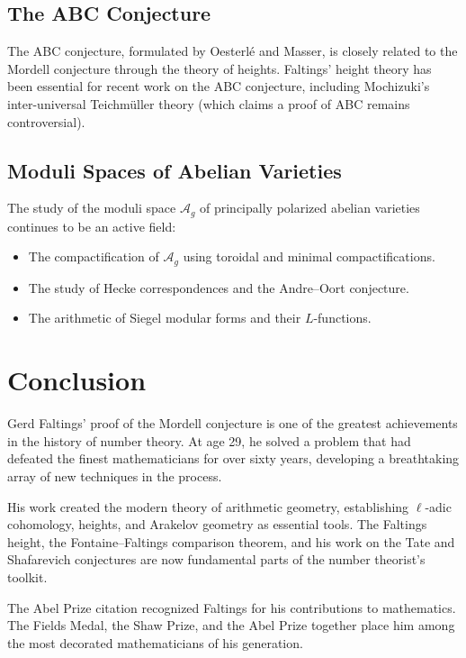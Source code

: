 \subsection{The ABC Conjecture}

The ABC conjecture, formulated by Oesterl\'e and Masser, is closely related to the Mordell conjecture through the theory of heights. Faltings' height theory has been essential for recent work on the ABC conjecture, including Mochizuki's inter-universal Teichm\"uller theory (which claims a proof of ABC remains controversial).

\subsection{Moduli Spaces of Abelian Varieties}

The study of the moduli space $\mathcal{A}_g$ of principally polarized abelian varieties continues to be an active field:
\begin{itemize}
\item The compactification of $\mathcal{A}_g$ using toroidal and minimal compactifications.
\item The study of Hecke correspondences and the Andre--Oort conjecture.
\item The arithmetic of Siegel modular forms and their $L$-functions.
\end{itemize}

\section{Conclusion}

Gerd Faltings' proof of the Mordell conjecture is one of the greatest achievements in the history of number theory. At age 29, he solved a problem that had defeated the finest mathematicians for over sixty years, developing a breathtaking array of new techniques in the process.

His work created the modern theory of arithmetic geometry, establishing $\ell$-adic cohomology, heights, and Arakelov geometry as essential tools. The Faltings height, the Fontaine--Faltings comparison theorem, and his work on the Tate and Shafarevich conjectures are now fundamental parts of the number theorist's toolkit.

The Abel Prize citation recognized Faltings for his contributions to mathematics. The Fields Medal, the Shaw Prize, and the Abel Prize together place him among the most decorated mathematicians of his generation.


